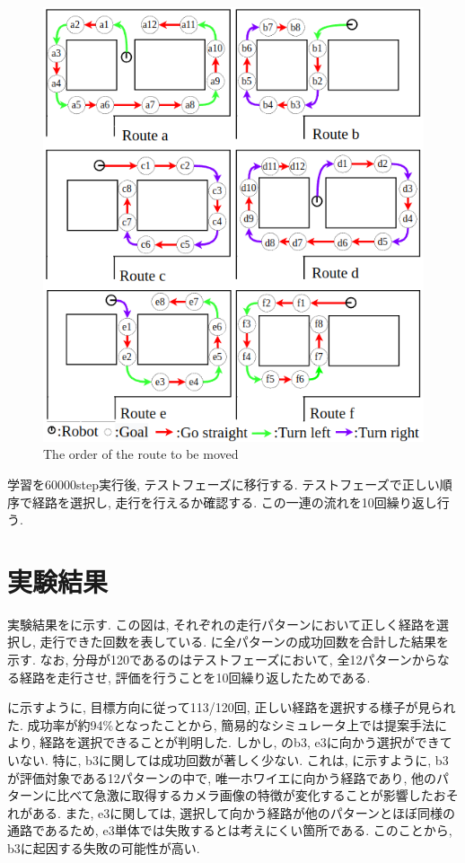 \begin{figure}[hbtp]
  \centering
 \includegraphics[keepaspectratio, scale=0.6]
      {images/route.png}
 \caption{The order of the route to be moved}
 \label{Fig:route}
\end{figure}

 学習を60000step実行後, テストフェーズに移行する. テストフェーズで正しい順序で経路を選択し, 走行を行えるか確認する. この一連の流れを10回繰り返し行う.


  \section{実験結果}
  実験結果をに示す. この図は, それぞれの走行パターンにおいて正しく経路を選択し, 走行できた回数を表している. に全パターンの成功回数を合計した結果を示す. なお, 分母が120であるのはテストフェーズにおいて, 全12パターンからなる経路を走行させ, 評価を行うことを10回繰り返したためである. 
  \par
  に示すように, 目標方向に従って113/120回, 正しい経路を選択する様子が見られた. 成功率が約94\%となったことから, 簡易的なシミュレータ上では提案手法により, 経路を選択できることが判明した. しかし, のb3, e3に向かう選択ができていない. 特に, b3に関しては成功回数が著しく少ない. これは, に示すように, b3が評価対象である12パターンの中で, 唯一ホワイエに向かう経路であり, 他のパターンに比べて急激に取得するカメラ画像の特徴が変化することが影響したおそれがある. また, e3に関しては, 選択して向かう経路が他のパターンとほぼ同様の通路であるため, e3単体では失敗するとは考えにくい箇所である. このことから, b3に起因する失敗の可能性が高い.


